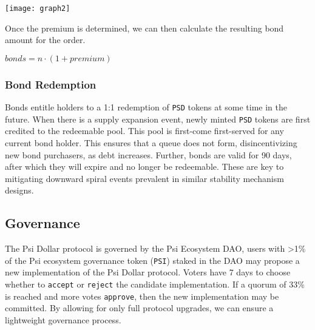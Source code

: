 \documentclass[a4paper, 12pt]{article}
\begin{document}
	\begin{center}
		\texttt{[image: graph2]}
	\end{center}
	
	Once the premium is determined, we can then calculate the resulting bond amount for the order.
	
	\begin{center}
		$bonds = n \cdot (1 + premium)$
	\end{center}

	\subsubsection{Bond Redemption}
	Bonds entitle holders to a 1:1 redemption of \texttt{PSD} tokens at some time in the future. When there is a supply expansion event, newly minted \texttt{PSD} tokens are first credited to the 				redeemable pool. This pool is first-come first-served for any current bond holder.
	This ensures that a queue does not form, disincentivizing new bond purchasers, as debt increases. Further, bonds are valid for 90 days, after which they will expire and no longer be redeemable. These 	are key to mitigating downward spiral events prevalent in similar stability mechanism designs.

	\subsection{Governance}
	The Psi Dollar protocol is governed by the Psi Ecosystem DAO, users with \textgreater1\% of the Psi ecosystem governance token (\texttt{PSI}) staked in the DAO may propose a new 						implementation of the Psi Dollar protocol.
	Voters have 7 days to choose whether to \texttt{accept} or \texttt{reject} the candidate implementation. If a quorum of 33\% is reached and more votes \texttt{approve}, then the new 					implementation may be committed.
	By allowing for only full protocol upgrades, we can ensure a lightweight governance process.
\end{document}
